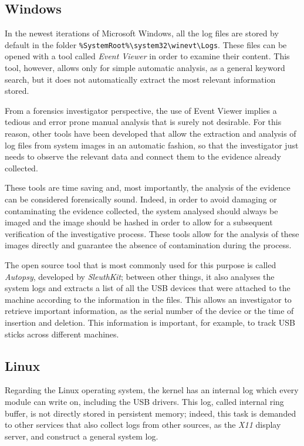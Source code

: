 \documentclass[a4paper]{article}
\begin{document}
\subsection{Windows}\label{sec:litWindows}
In the newest iterations of Microsoft Windows, all the log files are stored by
default in the folder
\texttt{\%SystemRoot\%\textbackslash{}system32\textbackslash{}winevt\textbackslash{}Logs}.
These files can be opened with a tool called \emph{Event Viewer} in order to
examine their content. This tool, however, allows only for simple automatic
analysis, as a general keyword search, but it does not automatically extract
the most relevant information stored.

From a forensics investigator perspective, the use of Event Viewer implies a
tedious and error prone manual analysis that is surely not desirable. For this
reason, other tools have been developed that allow the extraction and analysis
of log files from system images in an automatic fashion, so that the
investigator just needs to observe the relevant data and connect them to the
evidence already collected.

These tools are time saving and, most importantly, the analysis of the evidence
can be considered forensically sound. Indeed, in order to avoid damaging or
contaminating the evidence collected, the system analysed should always be
imaged and the image should be hashed in order to allow for a subsequent
verification of the investigative process. These tools allow for the analysis of
these images directly and guarantee the absence of contamination during the
process.~\cite{murphey2007automated}

The open source tool that is most commonly used for this purpose is called
\emph{Autopsy}, developed by \emph{SleuthKit}; between other things, it also
analyses the system logs and extracts a list of all the USB devices that were
attached to the machine according to the information in the files. This allows
an investigator to retrieve important information, as the serial number of the
device or the time of insertion and deletion. This information is important, for
example, to track USB sticks across different machines.~\cite{deb2015usb}

\subsection{Linux}
Regarding the Linux operating system, the kernel has an internal log which every
module can write on, including the USB drivers. This log, called internal ring
buffer, is not directly stored in persistent memory; indeed, this task is
demanded to other services that also collect logs from other sources, as the
\emph{X11} display server, and construct a general system log.
\end{document}
